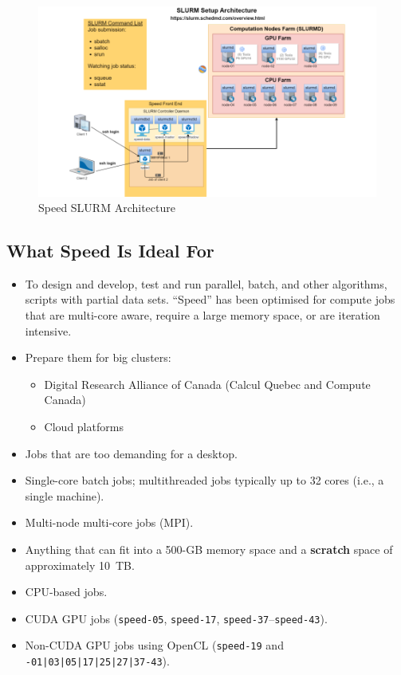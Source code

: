 \documentclass{easychair}
\begin{document}
\begin{figure}[htpb]
\includegraphics[width=\columnwidth]{images/slurm-arch}
\caption{Speed SLURM Architecture}
\label{fig:slurm-arch}
\end{figure}


\subsection{What Speed Is Ideal For}
\label{sect:speed-is-for}

\begin{itemize}
\item
To design and develop, test and run parallel, batch, and other algorithms, scripts with partial data sets. ``Speed'' has been optimised for compute jobs that are multi-core aware, require a large memory space, or are iteration intensive.
\item
Prepare them for big clusters:
	\begin{itemize}
	\item 
	Digital Research Alliance of Canada (Calcul Quebec and Compute Canada)
	\item 
	Cloud platforms
	\end{itemize}
\item
Jobs that are too demanding for a desktop. 
\item
Single-core batch jobs; multithreaded jobs typically up to 32 cores (i.e., a single machine).
\item
Multi-node multi-core jobs (MPI).
\item
Anything that can fit into a 500-GB memory space and a \textbf{scratch} space of approximately 10~TB. 
\item
CPU-based jobs. 
\item
CUDA GPU jobs (\texttt{speed-05}, \texttt{speed-17}, \texttt{speed-37}--\texttt{speed-43}).
\item
Non-CUDA GPU jobs using OpenCL (\texttt{speed-19} and \texttt{-01|03|05|17|25|27|37-43}).
\end{itemize}
\end{document}
